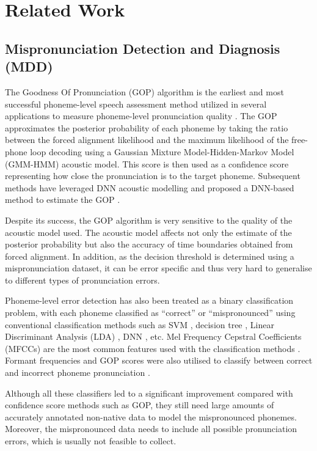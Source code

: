 \documentclass[12pt]{elsarticle}
\begin{document}
\section{Related Work}
\subsection{Mispronunciation Detection and Diagnosis (MDD)}
The Goodness Of Pronunciation (GOP) algorithm \cite{RN43} is the earliest and most successful phoneme-level speech assessment method utilized in several applications to measure phoneme-level pronunciation quality \cite{RN10, RN65, RN88, RN108, RN109, RN110, RN111}. The GOP approximates the posterior probability of each phoneme by taking the ratio between the forced alignment likelihood and the maximum likelihood of the free-phone loop decoding using a Gaussian Mixture Model-Hidden-Markov Model (GMM-HMM) acoustic model. This score is then used as a confidence score representing how close the pronunciation is to the target phoneme. Subsequent methods have leveraged DNN acoustic modelling and proposed a DNN-based method to estimate the GOP \cite{RN117, RN118, RN119}.

Despite its success, the GOP algorithm is very sensitive to the quality of the acoustic model used. The acoustic model affects not only the estimate of the posterior probability but also the accuracy of time boundaries obtained from forced alignment. In addition, as the decision threshold is determined using a mispronunciation dataset, it can be error specific and thus very hard to generalise to different types of pronunciation errors.

Phoneme-level error detection has also been treated as a binary classification problem, with each phoneme classified as “correct” or “mispronounced” using conventional classification methods such as SVM \cite{RN122}, decision tree \cite{RN120}, Linear Discriminant Analysis (LDA) \cite{RN121}, DNN \cite{RN126}, etc. Mel Frequency Cepstral Coefficients (MFCCs) are the most common features used with the classification methods \cite{RN120}. Formant frequencies and GOP scores were also utilised to classify between correct and incorrect phoneme pronunciation \cite{RN123}. 

Although all these classifiers led to a significant improvement compared with confidence score methods such as GOP, they still need large amounts of accurately annotated non-native data to model the mispronounced phonemes. Moreover, the mispronounced data needs to include all possible pronunciation errors, which is usually not feasible to collect.
\end{document}
